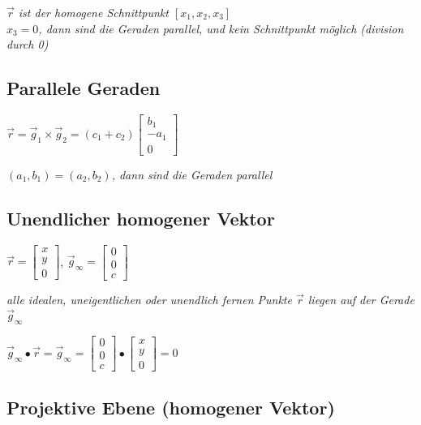 \textit{$\vec{r}$ ist der homogene Schnittpunkt $[x_1,x_2,x_3]$} \\
\textit{
    $x_3 = 0$, dann sind die Geraden parallel, und
    kein Schnittpunkt möglich (division durch 0)
}

\subsection{Parallele Geraden}

$\vec{r} = \vec{g}_1 \times \vec{g}_2 = (c_1 + c_2)\begin{bmatrix}
    b_1 \\ -a_1 \\ 0
\end{bmatrix}$

\textit{$(a_1, b_1) = (a_2, b_2)$, dann sind die Geraden parallel}

\subsection{Unendlicher homogener Vektor}

$\vec{r} = \begin{bmatrix}
    x \\ y \\ 0
\end{bmatrix}$, $\vec{g}_\infty = \begin{bmatrix}
    0 \\ 0 \\ c
\end{bmatrix}$

\textit{alle idealen, uneigentlichen oder unendlich fernen Punkte $\vec{r}$ liegen auf der Gerade $\vec{g}_\infty$}

$\vec{g}_\infty \bullet \vec{r} = \vec{g}_\infty = \begin{bmatrix}
    0 \\ 0 \\ c
\end{bmatrix} \bullet \begin{bmatrix}
    x \\ y \\ 0
\end{bmatrix} = 0$

\subsection{Projektive Ebene (homogener Vektor)}

